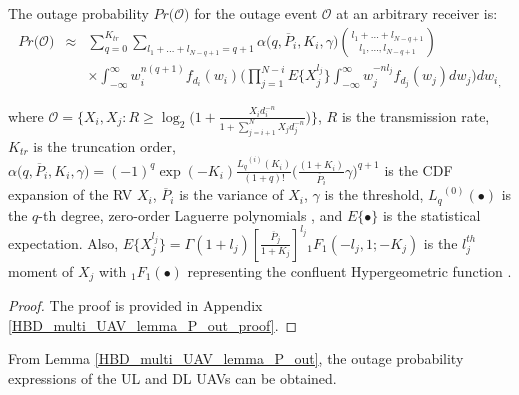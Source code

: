 \begin{lemma} \label{HBD_multi_UAV_lemma_P_out}
The outage probability $Pr\big(\mathcal{O}\big)$ for the outage event $\mathcal{O}$ at an arbitrary receiver is:
\begin{eqnarray} 
Pr\big(\mathcal{O}\big) & \approx & \sum_{q=0}^{K_{tr}} \sum_{l_1+\ldots+l_{N-q+1}=q+1} \alpha\big(q,\overline{P}_i,K_{i},\gamma\big) \binom{l_1 + \ldots + l_{N-q+1}}{l_1,\ldots, l_{N-q+1}} \nonumber \\
 & & \times \int_{-\infty}^{\infty} w_i^{n(q+1)}f_{d_i}(w_i) \Bigg( \prod_{j=1}^{N-i} E\Big\{X_{j}^{l_j}\Big\} \int_{-\infty}^{\infty} w_j^{-nl_j}f_{d_j}(w_j) dw_j \Bigg)  {dw_i}_,
\end{eqnarray}
\end{lemma}
where $\mathcal{O}=\Big\{ X_{i}, X_{j} : R \geq \log_{2}\Big(1 + \frac{X_i d_i^{-n}}{1+\sum_{j=i+1}^{N}X_j d_j^{-n}}\Big)\Big\}$, $R$ is the transmission rate, $K_{tr}$ is the truncation order, $\alpha\big(q,\overline{P}_i,K_i,\gamma\big) = (-1)^q \exp(-K_i) \frac{{L_q}^{(i)}(K_i)}{(1+q)!} \Big(\frac{(1+K_i)}{\overline{P}_i}\gamma\Big)^{q+1}$ is the CDF expansion of the RV $X_i$, $\overline{P}_i$ is the variance of $X_i$, $\gamma$ is the threshold, ${L_q}^{(0)}(\bullet)$ is the $q$-th degree, zero-order Laguerre polynomials \cite{tan2018joint, ernest2019outage}, and $E\{\bullet\}$ is the statistical expectation. Also, $E\Big\{X_{j}^{l_j}\Big\}=\Gamma(1+l_j) \left[\frac{\overline{P}_j}{1+K_{j}}\right]^{l_j} {}_1{F_1}(-l_j,1;-K_{j})$ is the $l_j^{th}$ moment of $X_j$ \cite[eq. (7)]{ernest2019outage} with ${}_1{F_1}(\bullet)$ representing the confluent Hypergeometric function \cite{ernest2019outage}.

\begin{proof}
The proof is provided in Appendix \ref{HBD_multi_UAV_lemma_P_out_proof}.
\end{proof} 

From Lemma \ref{HBD_multi_UAV_lemma_P_out}, the outage probability expressions of the UL and DL UAVs can be obtained.

